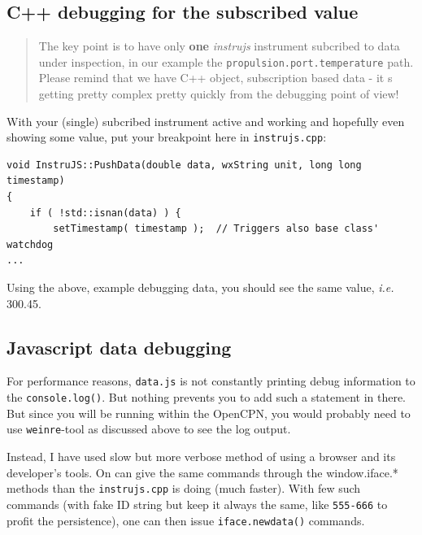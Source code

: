 \documentclass[11pt]{article}
\begin{document}
    \hypertarget{c-debugging-for-the-subscribed-value}{%
\subsection{C++ debugging for the subscribed
value}\label{c-debugging-for-the-subscribed-value}}

    \begin{quote}
The key point is to have only \textbf{one} \emph{instrujs} instrument
subcribed to data under inspection, in our example the
\texttt{propulsion.port.temperature} path. Please remind that we have
C++ object, subscription based data - it s getting pretty complex pretty
quickly from the debugging point of view!
\end{quote}

    With your (single) subcribed instrument active and working and hopefully
even showing some value, put your breakpoint here in
\texttt{instrujs.cpp}:

    \begin{verbatim}
void InstruJS::PushData(double data, wxString unit, long long timestamp)
{
    if ( !std::isnan(data) ) {
        setTimestamp( timestamp );  // Triggers also base class' watchdog
...        
\end{verbatim}

    Using the above, example debugging data, you should see the same value,
\emph{i.e.} 300.45.

    \hypertarget{javascript-data-debugging}{%
\subsection{Javascript data debugging}\label{javascript-data-debugging}}

    For performance reasons, \texttt{data.js} is not constantly printing
debug information to the \texttt{console.log()}. But nothing prevents
you to add such a statement in there. But since you will be running
within the OpenCPN, you would probably need to use \texttt{weinre}-tool
as discussed above to see the log output.

    Instead, I have used slow but more verbose method of using a browser and
its developer's tools. On can give the same commands through the
window.iface.* methods than the \texttt{instrujs.cpp} is doing (much
faster). With few such commands (with fake ID string but keep it always
the same, like \texttt{555-666} to profit the persistence), one can then
issue \texttt{iface.newdata()} commands.


    
    
    
\end{document}
